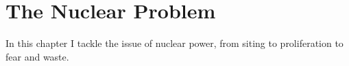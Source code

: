 \setchapterpreamble[u]{\margintoc}
\chapter{The Nuclear Problem}

In this chapter I tackle the issue of nuclear power, from siting to proliferation to fear and waste.